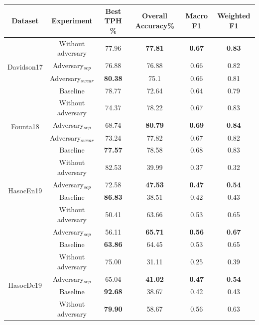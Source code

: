 \documentclass[11pt]{article}
\begin{document}
	\begin{table}[t!]
		\centering
		\small
		\begin{threeparttable}
			\begin{tabular}{|c|c|c|c|c|c|}
				\hline 
				Dataset & Experiment & Best TPH \% & Overall Accuracy\% & Macro F1 & Weighted F1 \\
				\hline
				\multirow{4}{*}{Davidson17} & Without adversary & 77.96 & \textbf{77.81} & \textbf{0.67} & \textbf{0.83} \\
				\cline{2-6}
				~ & Adversary$_{sep}$ & 76.88 & 76.88 & 0.66 & 0.82 \\
				\cline{2-6}
				~ & Adversary$_{swear}$ & \textbf{80.38} & 75.1 & 0.66 & 0.81 \\
				\cline{2-6}
				~ & Baseline & 78.77 & 72.64 & 0.64 & 0.79 \\
				\hline\hline
				\multirow{4}{*}{Founta18} & Without adversary & 74.37 & 78.22 & 0.67 & 0.83 \\
				\cline{2-6}
				~ & Adversary$_{sep}$ & 68.74 & \textbf{80.79} & \textbf{0.69} & \textbf{0.84} \\
				\cline{2-6}
				~ & Adversary$_{swear}$ & 73.24 & 77.82 & 0.67 & 0.82 \\
				\cline{2-6}
				~ & Baseline & \textbf{77.57} & 78.58 & 0.68 & 0.83 \\
				\hline\hline
				\multirow{4}{*}{HasocEn19} & Without adversary & 82.53 & 39.99 & 0.37 & 0.32 \\
				\cline{2-6}
				~ & Adversary$_{sep}$ & 72.58 & \textbf{47.53} & \textbf{0.47} & \textbf{0.54} \\
				\cline{2-6}
				~ & Baseline & \textbf{86.83} & 38.51 & 0.42 & 0.43 \\
				\hline\hline
				\multirow{4}{*}{GermEval18} & Without adversary & 50.41 & 63.66 & 0.53 & 0.65 \\
				\cline{2-6}
				~ & Adversary$_{sep}$ & 56.11 & \textbf{65.71} & \textbf{0.56} & \textbf{0.67} \\
				\cline{2-6}
				~ & Baseline & \textbf{63.86} & 64.45 & 0.53 & 0.65 \\
				\hline\hline
				\multirow{4}{*}{HasocDe19} & Without adversary & 75.00 & 31.11 & 0.25 & 0.39 \\
				\cline{2-6}
				~ & Adversary$_{sep}$ & 65.04 & \textbf{41.02} & \textbf{0.47} & \textbf{0.54} \\
				\cline{2-6}
				~ & Baseline & \textbf{92.68} & 38.67 & 0.42 & 0.43 \\
				\hline\hline
				\multirow{4}{*}{HasocHin19} & Without adversary & \textbf{79.90} & 58.67 & 0.56 & 0.63 \\

\end{tabular}
\end{threeparttable}
\end{table}
\end{document}
